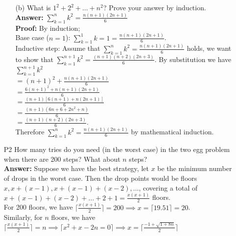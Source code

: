 \documentclass{article}
\begin{document}
\begin{itemize}
\begin{itemize}
                  \item [(b)] What is $1^2+2^2+\ldots+n^2$? Prove your answer by induction.\\
                        \textbf{Answer:} $\sum_{k=1}^n k^2=\frac{n(n+1)(2n+1)}{6}$\\\textbf{Proof:} By induction;\\Base case ($n=1$): $\sum_{k=1}^1 k=1=\frac{n(n+1)(2n+1)}{6}$.\\Inductive step: Assume that $\sum_{k=1}^n k^2=\frac{n(n+1)(2n+1)}{6}$ holds, we want to show that $\sum_{k=1}^{n+1} k^2=\frac{(n+1)(n+2)(2n+3)}{6}$. By substitution we have \\$\sum_{k=1}^{n+1} k^2$\\$=(n+1)^2+\frac{n(n+1)(2n+1)}{6}$\\$=\frac{6(n+1)^2+n(n+1)(2n+1)}{6}$\\$=\frac{(n+1)[6(n+1)+n(2n+1)]}{6}$\\$=\frac{(n+1)(6n+6+2n^2+n)}{6}$\\$=\frac{(n+1)(n+2)(2n+3)}{6}$.\\Therefore $\sum_{k=1}^n k^2=\frac{n(n+1)(2n+1)}{6}$ by mathematical induction.
            \end{itemize}
      \item [P2] How many tries do you need (in the worst case) in the two egg problem when there are 200 steps? What about $n$ steps?\\
            \textbf{Answer:} Suppose we have the best strategy, let $x$ be the minimum number of drops in the worst case. Then the drop points would be floors $x,x+(x-1),x+(x-1)+(x-2),\ldots$, covering a total of $x+(x-1)+(x-2)+\ldots+2+1=\frac{x(x+1)}{2}$ floors.\\
            For 200 floors, we have $\lceil\frac{x(x+1)}{2}\rceil=200\implies x=\lceil 19.51\rceil=\boxed{20}$.\\
            Similarly, for $n$ floors, we have $\lceil\frac{x(x+1)}{2}\rceil=n\implies\lceil x^2+x-2n=0\rceil\implies x=\boxed{\lceil\frac{-1+\sqrt{1+8n}}{2}\rceil}$
\end{itemize}
\end{document}
